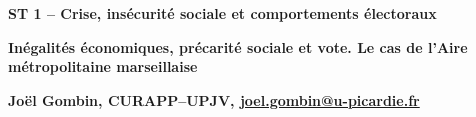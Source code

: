 \begin{center}\textbf{\Large ST 1 -- Crise, insécurité sociale et comportements électoraux}

\bigskip

\textbf{\Large Inégalités économiques, précarité sociale et vote. Le cas de l'Aire métropolitaine marseillaise}

\medskip

\textbf{\normalsize Joël Gombin, CURAPP--UPJV, \href{mailto:joel.gombin@u-picardie.fr}{joel.gombin@u-picardie.fr}}
\end{center}

\vspace{1.5cm}

